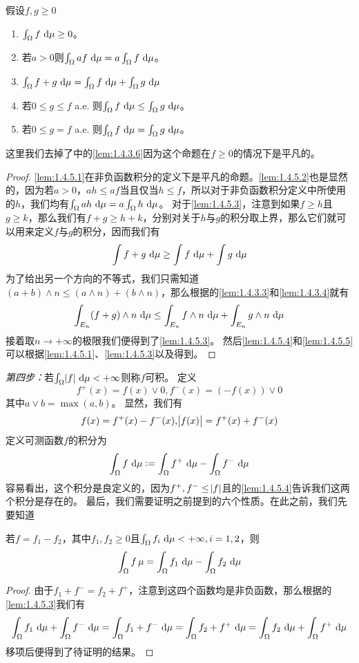 \documentclass[../main.tex]{subfiles}
\begin{document}
\begin{lemma}\label{lem:1.4.5}
	假设\(f,g\geq0\)
	\begin{enumerate}
		\item\label{lem:1.4.5.1} \(\int_\Omega f\,\dif\mu\geq0\)。
		\item\label{lem:1.4.5.2} 若\(a>0\)则\(\int_\Omega af\,\dif\mu=a\int_\Omega f\,\dif\mu\)。
		\item\label{lem:1.4.5.3} \(\int_\Omega f+g\,\dif\mu=\int_\Omega f\,\dif\mu+\int_\Omega g\,\dif\mu\)
		\item\label{lem:1.4.5.4} 若\(0\leq g\leq f\) a.e. 则\(\int_\Omega f\,\dif\mu\leq\int_\Omega g\,\dif\mu\)。
		\item\label{lem:1.4.5.5} 若\(0\leq g= f\) a.e. 则\(\int_\Omega f\,\dif\mu=\int_\Omega g\,\dif\mu\)。
	\end{enumerate}
\end{lemma}
这里我们去掉了中的\ref{lem:1.4.3.6}因为这个命题在\(f\geq0\)的情况下是平凡的。
\begin{proof}
	\ref{lem:1.4.5.1}在非负函数积分的定义下是平凡的命题。\ref{lem:1.4.5.2}也是显然的，因为若\(a>0\)，\(ah\leq af\)当且仅当\(h\leq f\)，所以对于非负函数积分定义中所使用的\(h\)，我们均有\(\int_\Omega ah\,\dif\mu=a\int_\Omega h\,\dif\mu\)。
	对于\ref{lem:1.4.5.3}，注意到如果\(f\geq h\)且\(g\geq k\)，那么我们有\(f+g\geq h+k\)，分别对关于\(h\)与\(g\)的积分取上界，那么它们就可以用来定义\(f\)与\(g\)的积分，因而我们有
	\[\int f+g\,\dif\mu\geq\int f\,\dif\mu+\int g\,\dif\mu\]
	为了给出另一个方向的不等式，我们只需知道\((a+b)\wedge n\leq (a\wedge n)+(b\wedge n)\)，那么根据的\ref{lem:1.4.3.3}和\ref{lem:1.4.3.4}就有
	\[\int_{E_n}(f+g)\wedge n\,\dif\mu\leq\int_{E_n}f\wedge n\,\dif\mu+\int_{E_n}g\wedge n\,\dif\mu\]
	接着取\(n\rightarrow+\infty\)的极限我们便得到了\ref{lem:1.4.5.3}。
	然后\ref{lem:1.4.5.4}和\ref{lem:1.4.5.5}可以根据\ref{lem:1.4.5.1}、\ref{lem:1.4.5.3}以及得到。
\end{proof}

\textit{第四步：}若\(\int_\Omega\envert{f}\,\dif\mu<+\infty\)则称\(f\)可积。
定义
\[f^+(x)=f(x)\vee 0, f^-(x)=(-f(x))\vee 0\]
其中\(a\vee b=\max(a,b)\)。
显然，我们有
\[f(x)=f^+(x)-f^-(x),\envert{f(x)}=f^+(x)+f^-(x)\]
定义可测函数\(f\)的积分为
\[\int_\Omega f\,\dif\mu:=\int_\Omega f^+\,\dif\mu-\int_\Omega f^-\,\dif\mu\]
容易看出，这个积分是良定义的，因为\(f^+,f^-\leq\envert{f}\)且的\ref{lem:1.4.5.4}告诉我们这两个积分是存在的。
最后，我们需要证明之前提到的六个性质。在此之前，我们先要知道
\begin{lemma}\label{lem:1.4.6}
	若\(f=f_1-f_2\)，其中\(f_1,f_2\geq0\)且\(\int_\Omega f_i\,\dif\mu<+\infty, i=1,2\)，则
	\[\int_\Omega f\,\mu=\int_\Omega f_1\,\dif\mu-\int_\Omega f_2\,\dif\mu\]
\end{lemma}
\begin{proof}
	由于\(f_1+f^-=f_2+f^+\)，注意到这四个函数均是非负函数，那么根据的\ref{lem:1.4.5.3}我们有
	\[\int_\Omega f_1\,\dif\mu+\int_\Omega f^-\,\dif\mu=\int_\Omega f_1+f^-\,\dif\mu=\int_\Omega f_2+f^+\,\dif\mu=\int_\Omega f_2\,\dif\mu+\int_\Omega f^+\,\dif\mu\]
	移项后便得到了待证明的结果。
\end{proof}
\end{document}
